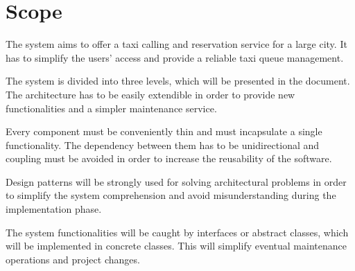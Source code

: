 \section{Scope}
\label{sec:scope}

The system aims to offer a taxi calling and reservation service for a large city. It has to simplify the users' access and provide a reliable taxi queue management.

The system is divided into three levels, which will be presented in the document. The architecture has to be easily extendible in order to provide new functionalities and a simpler maintenance service.
 
 Every component must be conveniently thin and must incapsulate a single functionality. The dependency between them has to be unidirectional and coupling must be avoided in order to increase the reusability of the software.
 
 Design patterns will be strongly used for solving architectural problems in order to simplify the system comprehension and avoid misunderstanding during the implementation phase.
 
 The system functionalities will be caught by interfaces or abstract classes, which will be implemented in concrete classes. This will simplify eventual maintenance operations and project changes.